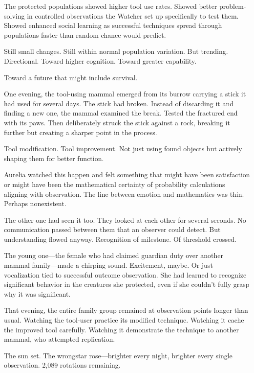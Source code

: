 The protected populations showed higher tool use rates. Showed better problem-solving in controlled observations the Watcher set up specifically to test them. Showed enhanced social learning as successful techniques spread through populations faster than random chance would predict.

Still small changes. Still within normal population variation. But trending. Directional. Toward higher cognition. Toward greater capability.

Toward a future that might include survival.

\scenebreak

One evening, the tool-using mammal emerged from its burrow carrying a stick it had used for several days. The stick had broken. Instead of discarding it and finding a new one, the mammal examined the break. Tested the fractured end with its paws. Then deliberately struck the stick against a rock, breaking it further but creating a sharper point in the process.

Tool modification. Tool improvement. Not just using found objects but actively shaping them for better function.

Aurelia watched this happen and felt something that might have been satisfaction or might have been the mathematical certainty of probability calculations aligning with observation. The line between emotion and mathematics was thin. Perhaps nonexistent.

The other one had seen it too. They looked at each other for several seconds. No communication passed between them that an observer could detect. But understanding flowed anyway. Recognition of milestone. Of threshold crossed.

The young one—the female who had claimed guardian duty over another mammal family—made a chirping sound. Excitement, maybe. Or just vocalization tied to successful outcome observation. She had learned to recognize significant behavior in the creatures she protected, even if she couldn't fully grasp why it was significant.

That evening, the entire family group remained at observation points longer than usual. Watching the tool-user practice its modified technique. Watching it cache the improved tool carefully. Watching it demonstrate the technique to another mammal, who attempted replication.

The sun set. The wrongstar rose—brighter every night, brighter every single observation. 2,089 rotations remaining.

